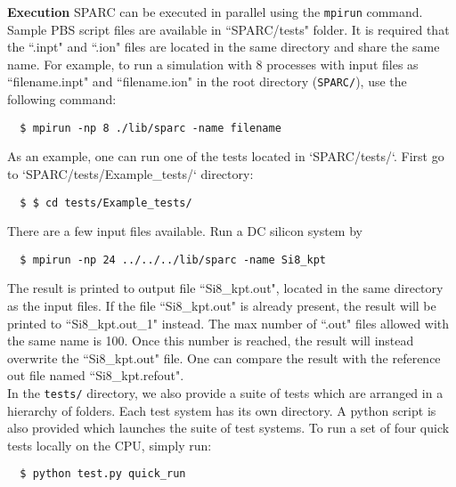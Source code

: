   \begin{frame}{\textbf{Execution}} \label{Execution}
  SPARC can be executed in parallel using the \texttt{mpirun} command. Sample PBS script files are available in ``SPARC/tests" folder. It is required that the ``.inpt" and ``.ion" files are located in the same directory and share the same name. For example, to run a simulation with 8 processes with input files as ``filename.inpt" and ``filename.ion" in the root directory (\texttt{SPARC/}), use the following command:
  \begin{verbatim}
  $ mpirun -np 8 ./lib/sparc -name filename
  \end{verbatim} 
  As an example, one can run one of the tests located in `SPARC/tests/`. First go to `SPARC/tests/Example\_tests/` directory:
  \begin{verbatim}
  $ $ cd tests/Example_tests/
  \end{verbatim} 
  There are a few input files available. Run a DC silicon system by
  \begin{verbatim}
  $ mpirun -np 24 ../../../lib/sparc -name Si8_kpt
  \end{verbatim} 
  
  The result is printed to output file ``Si8\_kpt.out", located in the same directory as the input files. If the file ``Si8\_kpt.out" is already present, the result will be printed to ``Si8\_kpt.out\_1" instead. The max number of ``.out" files allowed with the same name is 100. Once this number is reached, the result will instead overwrite the ``Si8\_kpt.out" file. One can compare the result with the reference out file named ``Si8\_kpt.refout".\\%
  
  
  \hspace{3mm} In the \texttt{tests/} directory, we also provide a suite of tests which are arranged in a hierarchy of folders. Each test system has its own directory. A python script is also provided which launches the suite of test systems. To run a set of four quick tests locally on the CPU, simply run: 
  \begin{verbatim}
  $ python test.py quick_run
  \end{verbatim} 
  

\end{frame}
